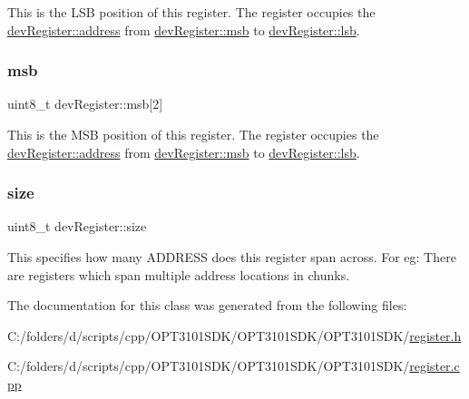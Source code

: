 This is the L\+SB position of this register. The register occupies the \mbox{\hyperlink{classdev_register_ad16fbe9cd26ba1e6d823141976f756da}{dev\+Register\+::address}} from \mbox{\hyperlink{classdev_register_a217b3d5b947f4c596bcdfb4ec175790f}{dev\+Register\+::msb}} to \mbox{\hyperlink{classdev_register_a6908a02139ef85a535848889583e6c12}{dev\+Register\+::lsb}}. 

\mbox{\label{classdev_register_a217b3d5b947f4c596bcdfb4ec175790f}} 
\subsubsection{\texorpdfstring{msb}{msb}}
{\footnotesize\ttfamily uint8\+\_\+t dev\+Register\+::msb\mbox{[}2\mbox{]}}



This is the M\+SB position of this register. The register occupies the \mbox{\hyperlink{classdev_register_ad16fbe9cd26ba1e6d823141976f756da}{dev\+Register\+::address}} from \mbox{\hyperlink{classdev_register_a217b3d5b947f4c596bcdfb4ec175790f}{dev\+Register\+::msb}} to \mbox{\hyperlink{classdev_register_a6908a02139ef85a535848889583e6c12}{dev\+Register\+::lsb}}. 

\mbox{\label{classdev_register_a6596e86ccbcd857febb5c28bc03aa480}} 
\subsubsection{\texorpdfstring{size}{size}}
{\footnotesize\ttfamily uint8\+\_\+t dev\+Register\+::size}



This specifies how many A\+D\+D\+R\+E\+SS does this register span across. For eg\+: There are registers which span multiple address locations in chunks. 



The documentation for this class was generated from the following files\+:\begin{DoxyCompactItemize}
\item 
C\+:/folders/d/scripts/cpp/\+O\+P\+T3101\+S\+D\+K/\+O\+P\+T3101\+S\+D\+K/\+O\+P\+T3101\+S\+D\+K/\mbox{\hyperlink{register_8h}{register.\+h}}\item 
C\+:/folders/d/scripts/cpp/\+O\+P\+T3101\+S\+D\+K/\+O\+P\+T3101\+S\+D\+K/\+O\+P\+T3101\+S\+D\+K/\mbox{\hyperlink{register_8cpp}{register.\+cpp}}\end{DoxyCompactItemize}
